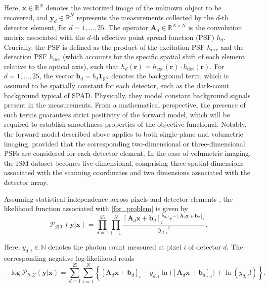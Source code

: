 \documentclass[letterpaper]{article}
\newcommand{\x}{\mathbf{x}}
\newcommand{\A}{\mathbf{A}}
\begin{document}
Here, $\x \in \mathbb{R}^N$ denotes the vectorized image of the unknown object to be recovered, and $\mathbf{y}_d \in \mathbb{R}^N$ represents the measurements collected by the $d$-th detector element, for $d = 1, \ldots, 25$. The operator $\A_d \in \mathbb{R}^{N \times N}$ is the convolution matrix associated with the $d$-th effective point spread function (PSF) $h_d$. Crucially, the PSF is defined as the product of the excitation PSF $h_{\text{exc}}$ and the detection PSF $h_{\text{det}}$ (which accounts for the specific spatial shift of each element relative to the optical axis), such that $h_d(\mathbf{r}) = h_{\text{exc}}(\mathbf{r}) \cdot h_{\text{det}}(\mathbf{r})$. 
For $d = 1, \ldots, 25$, the vector $\mathbf{b}_d = b_d \mathbf{1}_{\mathbb{R}^N}$ denotes the background term, which is assumed to be spatially constant for each detector, such as the dark-count background typical of SPAD.
Physically, they model constant background signals present in the measurements. From a mathematical perspective, the presence of such terms guarantees strict positivity of the forward model, which will be required to establish smoothness properties of the objective functional. Notably, the forward model described above applies to both single-plane and volumetric imaging, provided that the corresponding two-dimensional or three-dimensional PSFs are considered for each detector element. In the case of volumetric imaging, the ISM dataset becomes five-dimensional, comprising three spatial dimensions associated with the scanning coordinates and two dimensions associated with the detector array.

Assuming statistical independence across pixels and detector elements \cite{Bertero}, the likelihood function associated with \eqref{for_problem} is given by
\begin{equation} \label{eq:Pois_likelihood}
\mathcal{P}_{\mathcal{Y}|\mathcal{X}}(\mathbf{y} \vert \x)
=
\prod_{d=1}^{25}
\prod_{i=1}^{N}
\frac{
[\A_d \x + \mathbf{b}_d]_i^{\,y_{d,i}}
e^{-[\A_d \x + \mathbf{b}_d]_i}
}{
y_{d,i}!
}.
\end{equation}

Here, $y_{d,i} \in \mathbb{N}$ denotes the photon count measured at pixel $i$ of detector $d$. The corresponding negative log-likelihood reads
\begin{equation}
\label{eq:likelihood}
-\log \mathcal{P}_{\mathcal{Y}|\mathcal{X}}(\mathbf{y} \vert \x)
=
\sum_{d=1}^{25}
\sum_{i=1}^{N}
\left\{
[\A_d \x + \mathbf{b}_d]_i
-
y_{d,i}\ln\bigl([\A_d \x + \mathbf{b}_d]_i\bigr)
+
\ln(y_{d,i}!)
\right\}.
\end{equation}
\end{document}
